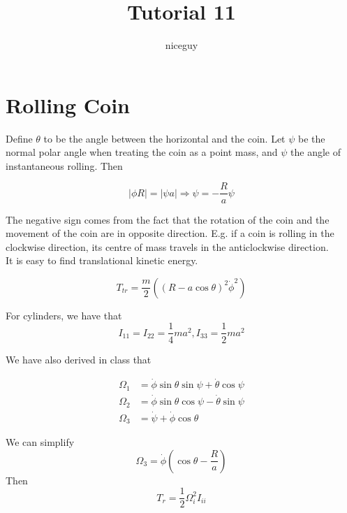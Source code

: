 \documentclass[12pt]{article}
\title{Tutorial 11}
\author{niceguy}
\begin{document}
\maketitle

\section{Rolling Coin}

Define $\theta$ to be the angle between the horizontal and the coin. Let $\psi$ be the normal polar angle when treating the coin as a point mass, and $\psi$ the angle of instantaneous rolling. Then

$$|\phi R| = |\psi a| \Rightarrow \psi = -\frac{R}{a} \psi$$

The negative sign comes from the fact that the rotation of the coin and the movement of the coin are in opposite direction. E.g. if a coin is rolling in the clockwise direction, its centre of mass travels in the anticlockwise direction. \\

It is easy to find translational kinetic energy.

$$T_{tr} = \frac{m}{2}((R - a\cos\theta)^2\dot\phi^2)$$

For cylinders, we have that
$$I_{11} = I_{22} = \frac{1}{4}ma^2, I_{33} = \frac{1}{2}ma^2$$

We have also derived in class that

\begin{align*}
    \Omega_1 &= \dot\phi\sin\theta\sin\psi + \dot\theta\cos\psi \\
    \Omega_2 &= \dot\phi\sin\theta\cos\psi - \dot\theta\sin\psi \\
    \Omega_3 &= \dot\psi + \dot\phi\cos\theta
\end{align*}

We can simplify
$$\Omega_3 = \dot\phi\left(\cos\theta - \frac{R}{a}\right)$$
Then
$$T_r = \frac{1}{2}\Omega_i^2I_{ii}$$
\end{document}
